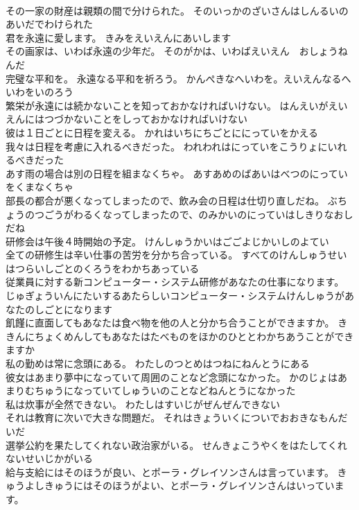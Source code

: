 \documentclass[8pt]{extreport}
\begin{document}
\begin{CJK}{UTF8}{min}
\\	その一家の財産は親類の間で分けられた。	そのいっかのざいさんはしんるいのあいだでわけられた 
\\	君を永遠に愛します。	きみをえいえんにあいします 
\\	その画家は、いわば永遠の少年だ。	そのがかは、いわばえいえん　おしょうねんだ 
\\	完璧な平和を。 永遠なる平和を祈ろう。	かんぺきなへいわを。えいえんなるへいわをいのろう 
\\	繁栄が永遠には続かないことを知っておかなければいけない。	はんえいがえいえんにはつづかないことをしっておかなければいけない 
\\	彼は１日ごとに日程を変える。	かれはいちにちごとににっていをかえる 
\\	我々は日程を考慮に入れるべきだった。	われわれはにっていをこうりょにいれるべきだった 
\\	あす雨の場合は別の日程を組まなくちゃ。	あすあめのばあいはべつのにっていをくまなくちゃ 
\\	部長の都合が悪くなってしまったので、飲み会の日程は仕切り直しだね。	ぶちょうのつごうがわるくなってしまったので、のみかいのにっていはしきりなおしだね 
\\	研修会は午後４時開始の予定。	けんしゅうかいはごごよじかいしのよてい 
\\	全ての研修生は辛い仕事の苦労を分かち合っている。	すべてのけんしゅうせいはつらいしごとのくろうをわかちあっている 
\\	従業員に対する新コンピューター・システム研修があなたの仕事になります。	じゅぎょういんにたいするあたらしいコンピューター・システムけんしゅうがあなたのしごとになります 
\\	飢饉に直面してもあなたは食べ物を他の人と分かち合うことができますか。	ききんにちょくめんしてもあなたはたべものをほかのひととわかちあうことができますか 
\\	私の勤めは常に念頭にある。	わたしのつとめはつねにねんとうにある 
\\	彼女はあまり夢中になっていて周囲のことなど念頭になかった。	かのじょはあまりむちゅうになっていてしゅういのことなどねんとうになかった 
\\	私は炊事が全然できない。	わたしはすいじがぜんぜんできない 
\\	それは教育に次いで大きな問題だ。	それはきょういくについでおおきなもんだいだ 
\\	選挙公約を果たしてくれない政治家がいる。	せんきょこうやくをはたしてくれないせいじかがいる 
\\	給与支給にはそのほうが良い、とポーラ・グレイソンさんは言っています。	きゅうよしきゅうにはそのほうがよい、とポーラ・グレイソンさんはいっています。 

\end{CJK}
\end{document}
